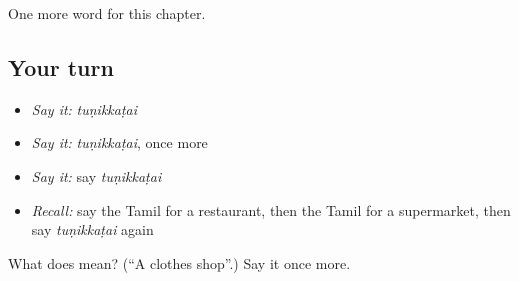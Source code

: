 \begin{grammarlens}[title={What you've built}]
One more word for this chapter.
\end{grammarlens}

\subsection*{Your turn}
\begin{itemize}
\raggedright
  \item \emph{Say it:} \emph{tuṇikkaṭai}
  \item \emph{Say it:} \emph{tuṇikkaṭai}, once more
  \item \emph{Say it:} say \emph{tuṇikkaṭai}
  \item \emph{Recall:} say the Tamil for a restaurant, then the Tamil for a supermarket, then say \emph{tuṇikkaṭai} again
\end{itemize}

\begin{tcolorbox}[breakable,colback=teal!4,colframe=teal!35!black,title={Before you move on}]
What does  mean? (\textquotedblleft{}A clothes shop\textquotedblright{}.) Say it once more.
\end{tcolorbox}
